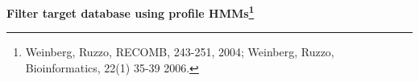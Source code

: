 \documentclass[landscape]{slides}
\begin{document}
\begin{slide}
\begin{center}
\large
\textbf{Filter target database using profile HMMs\footnote{Weinberg,
    Ruzzo, RECOMB, 243-251, 2004; Weinberg, Ruzzo, Bioinformatics,
    22(1) 35-39 2006.}}
\end{center}


\vfill
\end{slide}
\end{document}
